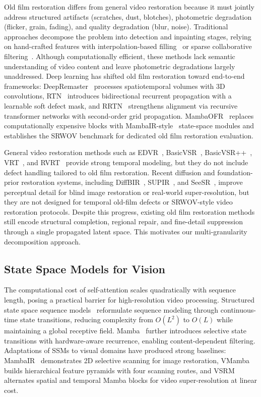 Old film restoration differs from general video restoration because it must jointly address structured artifacts (scratches, dust, blotches), photometric degradation (flicker, grain, fading), and quality degradation (blur, noise). Traditional approaches decompose the problem into detection and inpainting stages, relying on hand-crafted features with interpolation-based filling~\cite{kokaram2004missing} or sparse collaborative filtering~\cite{dabov2007bm3d,he2013guided}. Although computationally efficient, these methods lack semantic understanding of video content and leave photometric degradations largely unaddressed. Deep learning has shifted old film restoration toward end-to-end frameworks: DeepRemaster~\cite{iizuka2019deepremaster} processes spatiotemporal volumes with 3D convolutions, RTN~\cite{wan2022rtn} introduces bidirectional recurrent propagation with a learnable soft defect mask, and RRTN~\cite{lin2024rrtn} strengthens alignment via recursive transformer networks with second-order grid propagation. MambaOFR~\cite{mao2025mambaofr} replaces computationally expensive blocks with MambaIR-style~\cite{guo2024mambair} state-space modules and establishes the SRWOV benchmark for dedicated old film restoration evaluation.

General video restoration methods such as EDVR~\cite{wang2019edvr}, BasicVSR~\cite{chan2021basicvsr}, BasicVSR++~\cite{chan2022basicvsrpp}, VRT~\cite{liang2024vrt}, and RVRT~\cite{liang2022rvrt} provide strong temporal modeling, but they do not include defect handling tailored to old film restoration. Recent diffusion and foundation-prior restoration systems, including DiffBIR~\cite{lin2024diffbir}, SUPIR~\cite{yu2024supir}, and SeeSR~\cite{wu2024seesr}, improve perceptual detail for blind image restoration or real-world super-resolution, but they are not designed for temporal old-film defects or SRWOV-style video restoration protocols. Despite this progress, existing old film restoration methods still encode structural completion, regional repair, and fine-detail suppression through a single propagated latent space. This motivates our multi-granularity decomposition approach.

\subsection{State Space Models for Vision}
\label{subsec:ssm}

The computational cost of self-attention scales quadratically with sequence length, posing a practical barrier for high-resolution video processing. Structured state space sequence models~\cite{gu2022s4} reformulate sequence modeling through continuous-time state transitions, reducing complexity from $O(L^2)$ to $O(L)$ while maintaining a global receptive field. Mamba~\cite{gu2024mamba} further introduces selective state transitions with hardware-aware recurrence, enabling content-dependent filtering. Adaptations of SSMs to visual domains have produced strong baselines: MambaIR~\cite{guo2024mambair} demonstrates 2D selective scanning for image restoration, VMamba~\cite{liu2024vmamba} builds hierarchical feature pyramids with four scanning routes, and VSRM~\cite{tran2025vsrm} alternates spatial and temporal Mamba blocks for video super-resolution at linear cost.

